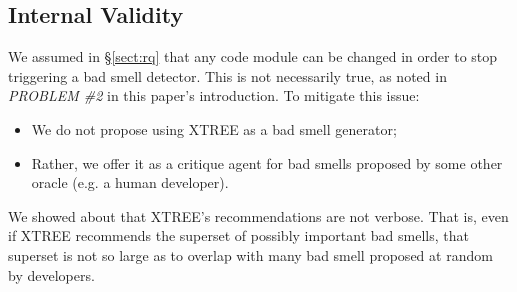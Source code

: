 \documentclass[twocolumn,5p]{elsarticle}
\newcommand{\bi}{\begin{itemize}[leftmargin=0.4cm]}
\newcommand{\ei}{\end{itemize}}
\newcommand{\tion}[1]{\S\ref{sect:#1}}
\newcommand{\fig}[1]{Figure~\ref{fig:#1}}
\theoremstyle{break}
\begin{document}
\begin{itemize}
{%



\subsection{  Internal Validity}\label{sect:coc}

We assumed in \tion{rq}
that any code module can be changed in order
to stop triggering a bad smell detector. This is not necessarily
true, as noted in {\em PROBLEM \#2} in this paper's introduction.
To mitigate this issue:
\begin{itemize}
    \item We do not propose using XTREE as a bad
smell generator;
\item Rather, we offer it as  a critique agent for bad smells
proposed by some other oracle (e.g. a human developer).
\end{itemize}
We showed about that XTREE's recommendations are not verbose.
That is, even if XTREE recommends the superset of possibly important bad smells,
that superset is not so large as to  overlap with many
 bad smell proposed at random 
by   developers. 

}
\end{itemize}
\end{document}
